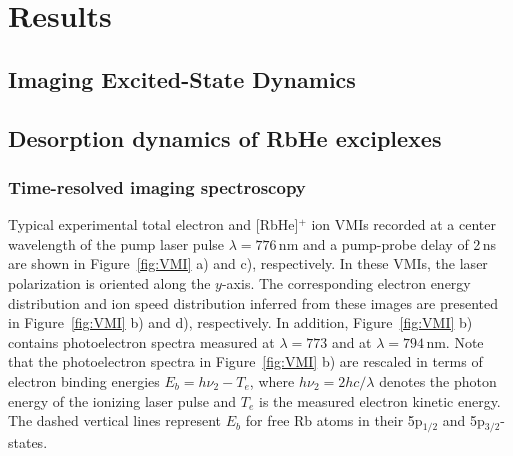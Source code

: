 \chapter{Results}
	\section{Imaging Excited-State Dynamics}
		

	\section{Desorption dynamics of RbHe exciplexes}
		\subsection{Time-resolved imaging spectroscopy}
		Typical experimental total electron and [RbHe]$^+$ ion VMIs recorded at a center wavelength of the pump laser pulse $\lambda=776$\,nm and a pump-probe delay of 2\,ns are shown in Figure~\ref{fig:VMI} a) and c), respectively. In these VMIs, the laser polarization is oriented along the $y$-axis. The corresponding electron energy distribution and ion speed distribution inferred from these images are presented in Figure~\ref{fig:VMI} b) and d), respectively. In addition, Figure~\ref{fig:VMI} b) contains photoelectron spectra measured at $\lambda=773$ and at $\lambda=794$\,nm. Note that the photoelectron spectra in Figure~\ref{fig:VMI} b) are rescaled in terms of electron binding energies $E_b=h\nu_2 - T_e$, where $h\nu_2=2hc/\lambda$ denotes the photon energy of the ionizing laser pulse and $T_e$ is the measured electron kinetic energy. The dashed vertical lines represent $E_b$ for free Rb atoms in their 5p$_{1/2}$ and 5p$_{3/2}$-states.

